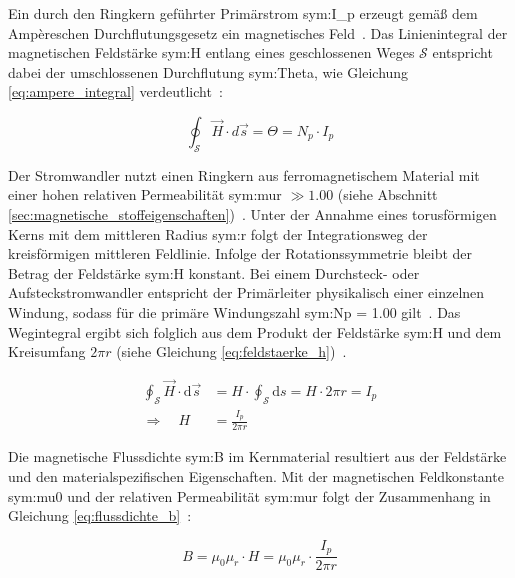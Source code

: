 Ein durch den Ringkern geführter Primärstrom \gls{sym:I_p} erzeugt gemäß dem Ampèreschen Durchflutungsgesetz ein magnetisches Feld~\cite[Kap.~4.5.4]{book-Physik_Ingenieure-Hering}. Das Linienintegral der magnetischen Feldstärke \gls{sym:H} entlang eines geschlossenen Weges $\mathcal{S}$ entspricht dabei der umschlossenen Durchflutung \gls{sym:Theta}, wie Gleichung \eqref{eq:ampere_integral} verdeutlicht~\cite[Kap.~4.5.4]{book-Physik_Ingenieure-Hering}:

\begin{equation}
    \oint_{\mathcal{S}} \vec{H}\cdot d\vec{s} = \Theta = N_p \cdot I_p
    \label{eq:ampere_integral}
\end{equation}

Der Stromwandler nutzt einen Ringkern aus ferromagnetischem Material mit einer hohen relativen Permeabilität \gls{sym:mur} $\gg \num{1,00}$ (siehe Abschnitt \ref{sec:magnetische_stoffeigenschaften})~\cite[Tab.~48]{book-Taschenbuch_Physik-Kuchling}. Unter der Annahme eines torusförmigen Kerns mit dem mittleren Radius \gls{sym:r} folgt der Integrationsweg der kreisförmigen mittleren Feldlinie. Infolge der Rotationssymmetrie bleibt der Betrag der Feldstärke \gls{sym:H} konstant. Bei einem Durchsteck- oder Aufsteckstromwandler entspricht der Primärleiter physikalisch einer einzelnen Windung, sodass für die primäre Windungszahl \gls{sym:Np} = \num{1,00} gilt~\cite[S.~63]{book-Technologie_Messwandler-Minkner}. Das Wegintegral ergibt sich folglich aus dem Produkt der Feldstärke \gls{sym:H} und dem Kreisumfang $2\pi r$ (siehe Gleichung \eqref{eq:feldstaerke_h})~\cite[Kap.~4.5.4]{book-Physik_Ingenieure-Hering}.

\begin{align}
    \oint_{\mathcal{S}} \vec{H} \cdot \mathrm{d}\vec{s} & = H \cdot \oint_{\mathcal{S}} \mathrm{d}s = H \cdot 2\pi r = I_{p} \nonumber \\[6pt]
    \Rightarrow \quad H                                 & = \frac{I_{p}}{2\pi r}
    \label{eq:feldstaerke_h}
\end{align}

Die magnetische Flussdichte \gls{sym:B} im Kernmaterial resultiert aus der Feldstärke und den materialspezifischen Eigenschaften. Mit der magnetischen Feldkonstante \gls{sym:mu0} und der relativen Permeabilität \gls{sym:mur} folgt der Zusammenhang in Gleichung \eqref{eq:flussdichte_b}~\cite[Kap.~4.5.4]{book-Physik_Ingenieure-Hering}:

\begin{equation}
    B = \mu_0 \mu_r \cdot H = \mu_0 \mu_r \cdot \frac{I_{p}}{2\pi r}
    \label{eq:flussdichte_b}
\end{equation}

